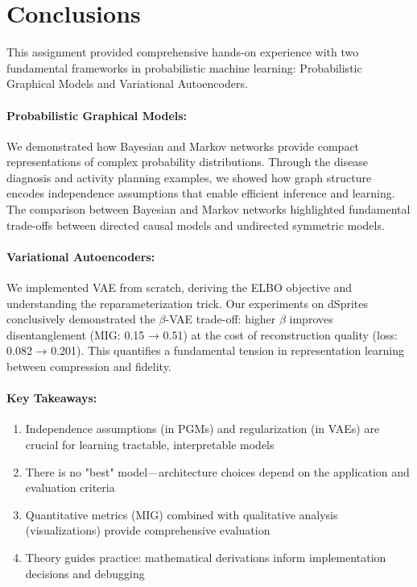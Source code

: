 \documentclass[conference]{IEEEtran}
\begin{document}
\section{Conclusions}

This assignment provided comprehensive hands-on experience with two fundamental frameworks in probabilistic machine learning: Probabilistic Graphical Models and Variational Autoencoders.

\paragraph{Probabilistic Graphical Models:} We demonstrated how Bayesian and Markov networks provide compact representations of complex probability distributions. Through the disease diagnosis and activity planning examples, we showed how graph structure encodes independence assumptions that enable efficient inference and learning. The comparison between Bayesian and Markov networks highlighted fundamental trade-offs between directed causal models and undirected symmetric models.

\paragraph{Variational Autoencoders:} We implemented VAE from scratch, deriving the ELBO objective and understanding the reparameterization trick. Our experiments on dSprites conclusively demonstrated the $\beta$-VAE trade-off: higher $\beta$ improves disentanglement (MIG: 0.15 → 0.51) at the cost of reconstruction quality (loss: 0.082 → 0.201). This quantifies a fundamental tension in representation learning between compression and fidelity.

\paragraph{Key Takeaways:}
\begin{enumerate}
    \item Independence assumptions (in PGMs) and regularization (in VAEs) are crucial for learning tractable, interpretable models
    \item There is no "best" model—architecture choices depend on the application and evaluation criteria
    \item Quantitative metrics (MIG) combined with qualitative analysis (visualizations) provide comprehensive evaluation
    \item Theory guides practice: mathematical derivations inform implementation decisions and debugging
\end{enumerate}
\end{document}
